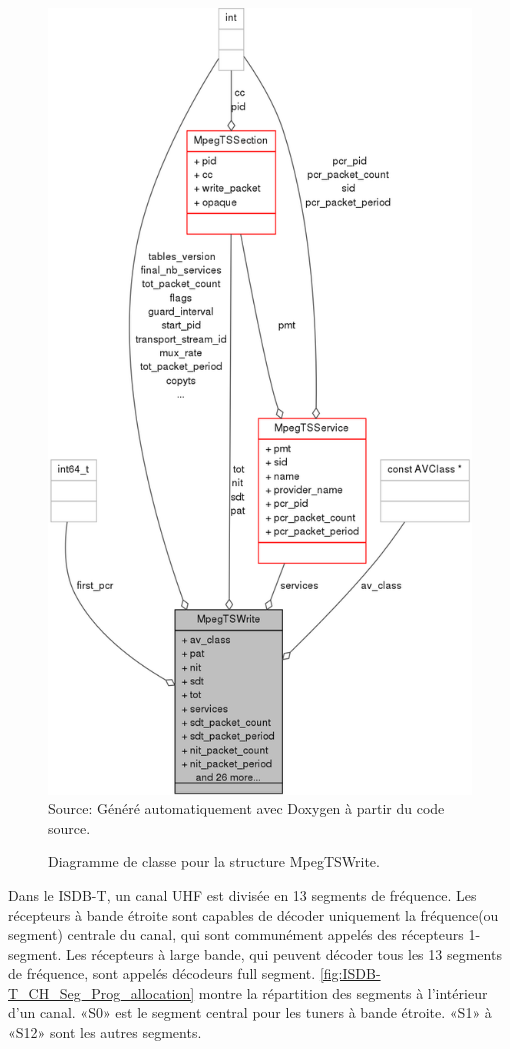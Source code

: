 \documentclass[12pt,a4paper]{article}
\begin{document}
\begin{figure}[H]
\centering
\caption{Diagramme de classe pour la structure MpegTSWrite.}
\includegraphics[width=0.7\linewidth]{pictures/structMpegTSWrite__coll__graph.png}
\\Source: Généré automatiquement avec Doxygen à partir du code source.
\label{fig:structMpegTSWrite__coll__graph}
\end{figure}

\newpage
{}
\label{modulation}

Dans le ISDB-T, un canal UHF est divisée en 13 segments de fréquence. Les récepteurs à bande étroite sont capables de décoder uniquement la fréquence(ou segment)  centrale du canal, qui sont communément appelés des récepteurs 1-segment. Les récepteurs à large bande, qui peuvent décoder tous les 13 segments de fréquence, sont appelés décodeurs full segment. \autoref{fig:ISDB-T_CH_Seg_Prog_allocation} montre la répartition des segments à l'intérieur d'un canal. «S0» est le segment central pour les tuners à bande étroite. «S1» à «S12» sont les autres segments.
\end{document}
